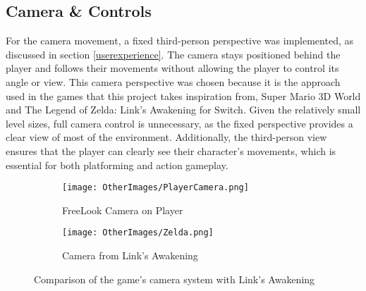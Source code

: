 \documentclass[10pt]{final_report}
\begin{document}
\subsection{Camera \& Controls}
For the camera movement, a fixed third-person perspective was implemented, as discussed in section \ref{userexperience}.  The camera stays positioned behind the player and follows their movements without allowing the player to control its angle or view. 
This camera perspective was chosen because it is the approach used in the games that this project takes inspiration from, Super Mario 3D World and The Legend of Zelda: Link’s Awakening for Switch. Given the relatively small level sizes, full camera control is unnecessary, as the fixed perspective provides a clear view of most of the environment. Additionally, the third-person view ensures that the player can clearly see their character’s movements, which is essential for both platforming and action gameplay.
\begin{figure}[H]
    \centering
    \begin{subfigure}{0.48\textwidth}
        \centering
        \texttt{[image: OtherImages/PlayerCamera.png]}
        \caption{FreeLook Camera on Player}
        \label{fig:label_camera}
    \end{subfigure}
    \hfill
    \begin{subfigure}{0.48\textwidth}
        \centering
        \texttt{[image: OtherImages/Zelda.png]}
        \caption{Camera from Link's Awakening}
        \label{fig:label_linkcamera}
    \end{subfigure}
    \caption{Comparison of the game's camera system with Link's Awakening}
\end{figure}
\end{document}
